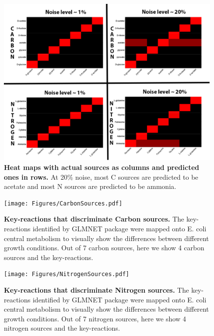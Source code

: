 \documentclass[12pt]{article}
\begin{document}
\begin{figure}[!ht]
\begin{center}
\includegraphics[width=6in]{Figures/heatmap.pdf}
\end{center}
\caption{
{\bf Heat maps with actual sources as columns and predicted ones in rows.}  At 20\% noise, most C sources are predicted to be acetate and most N sources are predicted to be ammonia.
}
\label{Figure_label}
\end{figure}

\begin{figure}[!ht]
\begin{center}
\hspace*{-3.5cm}
\texttt{[image: Figures/CarbonSources.pdf]}
\end{center}
\caption{
{\bf Key-reactions that discriminate Carbon sources.}  The key-reactions identified by GLMNET package were mapped onto E. coli central metabolism to visually show the differences between different growth conditions. Out of 7 carbon sources, here we show 4 carbon sources and the key-reactions.
}
\label{Figure_label}
\end{figure}

\begin{figure}[!ht]
\begin{center}
\hspace*{-3.25cm}
\texttt{[image: Figures/NitrogenSources.pdf]}
\end{center}
\caption{
{\bf Key-reactions that discriminate Nitrogen sources.}  The key-reactions identified by GLMNET package were mapped onto E. coli central metabolism to visually show the differences between different growth conditions. Out of 7 nitrogen sources, here we show 4 nitrogen sources and the key-reactions.
}
\label{Figure_label}
\end{figure}
\end{document}

